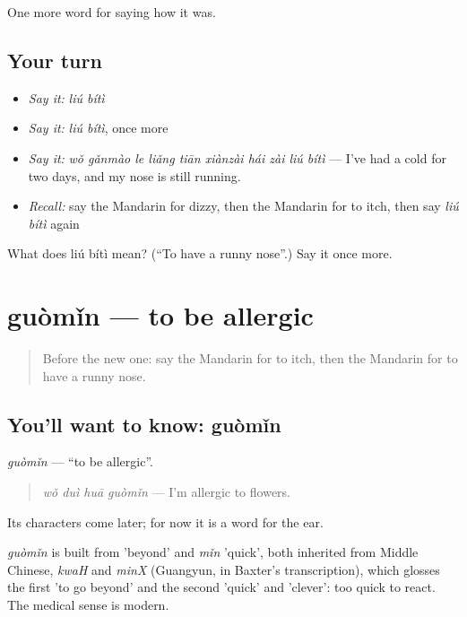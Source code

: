 \begin{grammarlens}[title={What you've built}]
One more word for saying how it was.
\end{grammarlens}

\subsection*{Your turn}
\begin{itemize}
\raggedright
  \item \emph{Say it:} \emph{liú bítì}
  \item \emph{Say it:} \emph{liú bítì}, once more
  \item \emph{Say it:} \emph{wǒ gǎnmào le liǎng tiān xiànzài hái zài liú bítì} — I've had a cold for two days, and my nose is still running.
  \item \emph{Recall:} say the Mandarin for dizzy, then the Mandarin for to itch, then say \emph{liú bítì} again
\end{itemize}

\begin{tcolorbox}[breakable,colback=teal!4,colframe=teal!35!black,title={Before you move on}]
What does liú bítì mean? (\textquotedblleft{}To have a runny nose\textquotedblright{}.) Say it once more.
\end{tcolorbox}
\section[guòmǐn]{guòmǐn — to be allergic}

\label{lesson:ZH-C480-guomin}



\begin{quote}
Before the new one: say the Mandarin for to itch, then the Mandarin for to have a runny nose.
\end{quote}

\subsection*{You'll want to know: guòmǐn}
\emph{guòmǐn} — \textquotedblleft{}to be allergic\textquotedblright{}.

\begin{quote}
\emph{wǒ duì huā guòmǐn} — I'm allergic to flowers.
\end{quote}

Its characters come later; for now it is a word for the ear.

\begin{cousinweb}
\emph{guòmǐn} is built from  'beyond' and \emph{mǐn} 'quick', both inherited from Middle Chinese, \emph{kwaH} and \emph{minX} (Guangyun, in Baxter's transcription), which glosses the first 'to go beyond' and the second 'quick' and 'clever': too quick to react. The medical sense is modern.
\end{cousinweb}

